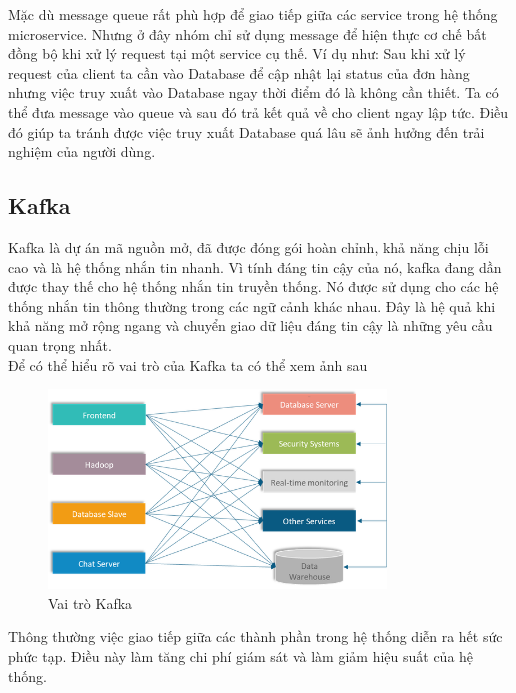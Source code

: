             Mặc dù message queue rất phù hợp để giao tiếp giữa các service trong hệ thống microservice. Nhưng ở đây nhóm chỉ sử dụng message để hiện thực cơ chế bất đồng bộ khi xử lý request tại một service cụ thế. Ví dụ như: Sau khi xử lý request của client ta cần vào Database để cập nhật lại status của đơn hàng nhưng việc truy xuất vào Database ngay thời điểm đó là không cần thiết. Ta có thể đưa message vào queue và sau đó trả kết quả về cho client ngay lập tức. Điều đó giúp ta tránh được việc truy xuất Database quá lâu sẽ ảnh hưởng đến trải nghiệm của người dùng.
            
            \subsection{Kafka}
            
            Kafka\cite{kafka} là dự án mã nguồn mở, đã được đóng gói hoàn chỉnh, khả năng chịu lỗi cao và là hệ thống nhắn tin nhanh. Vì tính đáng tin cậy của nó, kafka đang dần được thay thế cho hệ thống nhắn tin truyền thống. Nó được sử dụng cho các hệ thống nhắn tin thông thường trong các ngữ cảnh khác nhau. Đây là hệ quả khi khả năng mở rộng ngang và chuyển giao dữ liệu đáng tin cậy là những yêu cầu quan trọng nhất.\\
            
            Để có thể hiểu rõ vai trò của Kafka ta có thể xem ảnh sau
            
            \begin{figure}[H]   			
            	\includegraphics[width=0.8\textwidth]{Images/Kafka1.png}
    			\centering
    			\linebreak
    			\caption{Vai trò Kafka}
            \end{figure}
            
            Thông thường việc giao tiếp giữa các thành phần trong hệ thống diễn ra hết sức phức tạp. Điều này làm tăng chi phí giám sát và làm giảm hiệu suất của hệ thống.\\
            
